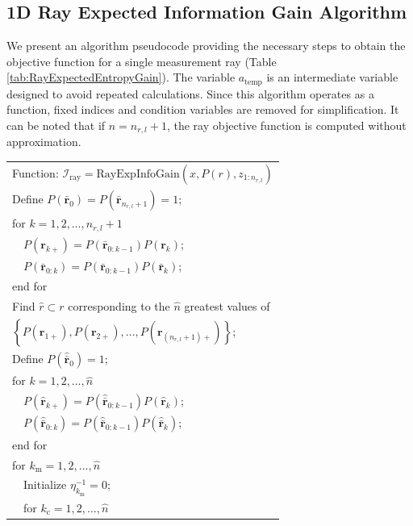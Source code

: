 \documentclass[letterpaper, 10pt]{ieeeconf}
\newcommand{\braces}[1]{\ensuremath{\left\{ #1 \right\}}}
\begin{document}
\subsection{1D Ray Expected Information Gain Algorithm}

We present an algorithm pseudocode providing the necessary steps to obtain the objective function for a single measurement ray (Table \ref{tab:RayExpectedEntropyGain}). The variable $a_\text{temp}$ is an intermediate variable designed to avoid repeated calculations.
Since this algorithm operates as a function, fixed indices and condition variables are removed for simplification. It can be noted that if $\hat n=n_{r,l}+1$, the ray objective function is computed without approximation.

\begin{table}
\begin{tabular}{ l }
  Function: $\mathcal I_\text{ray}=\text{RayExpInfoGain}(x,P(r),z_{1:n_{r,l}})$\\
  Define $P(\bar{\mathbf{r}}_{0})=P(\bar{\mathbf{r}}_{n_{r,l}+1})=1$;\\
  for $k = 1,2,\ldots,n_{r,l}+1$\\
   \ \ $P(\mathbf{r}_{k+}) = P(\bar{\mathbf{r}}_{0:k-1})P(\mathbf{r}_{k})$;\\
   \ \ $P(\bar{\mathbf{r}}_{0:k})=P(\bar{\mathbf{r}}_{0:k-1})P(\bar{\mathbf{r}}_{k})$;\\
  end for\\
  Find $\hat r\subset r$ corresponding to the $\hat n$ greatest values of\\
  $\braces{P(\mathbf{r}_{1+}),P(\mathbf{r}_{2+}),\ldots,P(\mathbf{r}_{(n_{r,l}+1)+})}$;\\
  Define $P(\hat{\bar{\mathbf{r}}}_{0})=1$;\\
  for $k = 1,2,\ldots,\hat{n}$\\
   \ \ $P(\hat{\mathbf{r}}_{k+}) = P(\hat{\bar{\mathbf{r}}}_{0:k-1})P(\hat{\mathbf{r}}_{k})$;\\
   \ \ $P(\hat{\bar{\mathbf{r}}}_{0:k})=P(\hat{\bar{\mathbf{r}}}_{0:k-1})P(\hat{\bar{\mathbf{r}}}_{k})$;\\
  end for\\
  for $k_\text{m}=1,2,\ldots,\hat n$\\
   \ \ Initialize $\eta^{-1}_{k_\text{m}}=0$;\\
   \ \ for $k_\text{c}=1,2,\ldots,\hat n$\\

\end{tabular}
\end{table}
\end{document}
